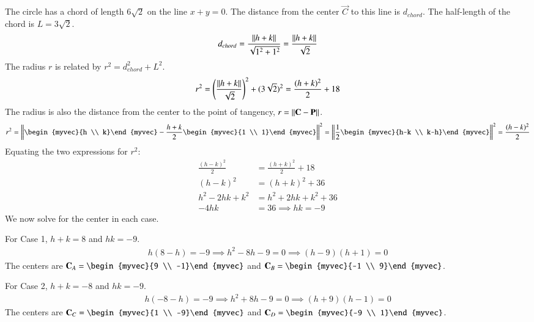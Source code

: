 \documentclass[journal]{IEEEtran}
\begin{document}
	The circle has a chord of length $6\sqrt{2}$ on the line $x+y=0$. The distance from the center $\vec{C}$ to this line is $d_{chord}$. The half-length of the chord is $L=3\sqrt{2}$.
	\begin{align}
		d_{chord} = \frac{\left\lVert h+k\right\rVert}{\sqrt{1^2+1^2}} = \frac{\left\lVert h+k\right\rVert}{\sqrt{2}}
	\end{align}
	The radius $r$ is related by $r^2 = d_{chord}^2 + L^2$.
	\begin{align}
		r^2 = \left(\frac{\left\lVert h+k\right\rVert}{\sqrt{2}}\right)^2 + (3\sqrt{2})^2 = \frac{(h+k)^2}{2} + 18
	\end{align}
	The radius is also the distance from the center to the point of tangency, $r = \left\lVert\mathbf{C}-\mathbf{P}\right\rVert$.
	\begin{align}
		r^2 = \norm{\begin{myvec}{h \\ k}\end{myvec} - \frac{h+k}{2}\begin{myvec}{1 \\ 1}\end{myvec}}^2 = \norm{\frac{1}{2}\begin{myvec}{h-k \\ k-h}\end{myvec}}^2 = \frac{(h-k)^2}{2}
	\end{align}
	Equating the two expressions for $r^2$:
	\begin{align}
		\frac{(h-k)^2}{2} &= \frac{(h+k)^2}{2} + 18 \nonumber \\
		(h-k)^2 &= (h+k)^2 + 36 \nonumber \\
		h^2-2hk+k^2 &= h^2+2hk+k^2+36 \nonumber \\
		-4hk &= 36 \implies hk = -9
	\end{align}
	We now solve for the center in each case.
	
	For Case 1, $h+k=8$ and $hk=-9$. 
	\begin{align}
		h(8-h)=-9 \implies h^2-8h-9=0 \implies (h-9)(h+1)=0
	\end{align}
	The centers are $\vec{C}_A = \begin{myvec}{9 \\ -1}\end{myvec}$ and $\vec{C}_B = \begin{myvec}{-1 \\ 9}\end{myvec}$.
	
	For Case 2, $h+k=-8$ and $hk=-9$. 
	\begin{align}
		h(-8-h)=-9 \implies h^2+8h-9=0 \implies (h+9)(h-1)=0
	\end{align}
	The centers are $\vec{C}_C = \begin{myvec}{1 \\ -9}\end{myvec}$ and $\vec{C}_D = \begin{myvec}{-9 \\ 1}\end{myvec}$.
	
\end{document}
